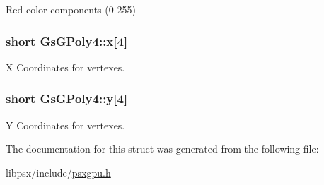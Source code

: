 Red color components (0-\/255) 

\hypertarget{structGsGPoly4_a90f4eabdef6d4b712a9a93d1b2a2d30c}{}
\subsubsection[{x}]{\setlength{\rightskip}{0pt plus 5cm}short Gs\+G\+Poly4\+::x\mbox{[}4\mbox{]}}\label{structGsGPoly4_a90f4eabdef6d4b712a9a93d1b2a2d30c}


X Coordinates for vertexes. 

\hypertarget{structGsGPoly4_a7c1e7cdef1183cdcf81f8293446fd9f4}{}
\subsubsection[{y}]{\setlength{\rightskip}{0pt plus 5cm}short Gs\+G\+Poly4\+::y\mbox{[}4\mbox{]}}\label{structGsGPoly4_a7c1e7cdef1183cdcf81f8293446fd9f4}


Y Coordinates for vertexes. 



The documentation for this struct was generated from the following file\+:\begin{DoxyCompactItemize}
\item 
libpsx/include/\hyperlink{psxgpu_8h}{psxgpu.\+h}\end{DoxyCompactItemize}
